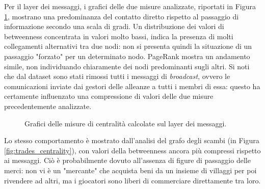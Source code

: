 Per il layer dei messaggi, i grafici delle due misure analizzate, riportati in Figura \ref{fig:messages_centrality}, mostrano una predominanza del contatto diretto rispetto al passaggio di informazione secondo una scala di gradi. Un distribuzione dei valori di betweenness concentrata in valori molto bassi, indica la presenza di molti collegamenti alternativi tra due nodi: non si presenta quindi la situazione di un passaggio "forzato" per un determinato nodo. PageRank mostra un andamento simile, non individuando chiaramente dei nodi predominanti sugli altri. Si noti che dal dataset sono stati rimossi tutti i messaggi di \textit{broadcast}, ovvero le comunicazioni inviate dai gestori delle alleanze a tutti i membri di essa: questo ha certamente influenzato una compressione di valori delle due misure precedentemente analizzate.\\ 
\begin{figure}
	\hfill
	\caption{Grafici delle misure di centralità calcolate sul layer dei messaggi.}
	\label{fig:messages_centrality}
\end{figure}
Lo stesso comportamento è mostrato dall'analisi del grafo degli scambi (in Figura \ref{fig:trades_centrality}), con valori della betweenness ancora più compressi rispetto ai messaggi. Ciò è probabilmente dovuto all'assenza di figure di passaggio delle merci: non vi è un "mercante" che acquista beni da un insieme di villaggi per poi rivendere ad altri, ma i giocatori sono liberi di commerciare direttamente tra loro.
